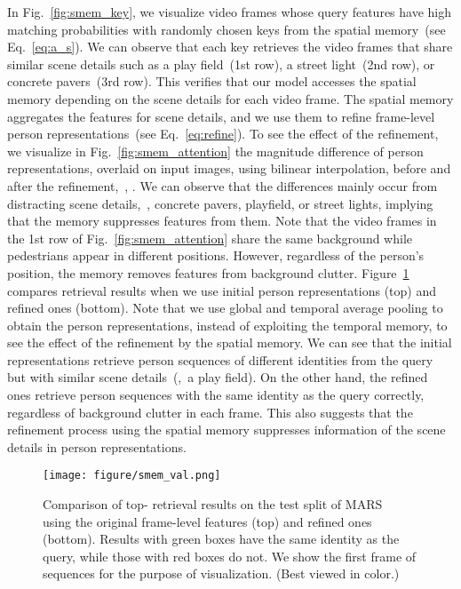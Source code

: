 \documentclass[10pt,twocolumn,letterpaper]{article}
\begin{document}
		
			In Fig.~\ref{fig:smem_key}, we visualize video frames whose query features  have high matching probabilities with randomly chosen keys from the spatial memory~(see Eq.~\eqref{eq:a_s}). We can observe that each key retrieves the video frames that share similar scene details such as a play field~(1st row), a street light~(2nd row), or concrete pavers~(3rd row). This verifies that our model accesses the spatial memory depending on the scene details for each video frame. The spatial memory aggregates the features for scene details, and we use them to refine frame-level person representations~(see Eq.~\eqref{eq:refine}). To see the effect of the refinement, we visualize in Fig.~\ref{fig:smem_attention} the magnitude difference of person representations, overlaid on input images, using bilinear interpolation, before and after the refinement,~\ie, . We can observe that the differences mainly occur from distracting scene details,~\eg, concrete pavers, playfield, or street lights, implying that the memory suppresses features from them. Note that the video frames in the 1st row of Fig.~\ref{fig:smem_attention} share the same background while pedestrians appear in different positions. However, regardless of the person's position, the memory removes features from background clutter. Figure~\ref{fig:smem_val} compares retrieval results when we use initial person representations  (top) and refined ones  (bottom). Note that we use global and temporal average pooling to obtain the person representations, instead of exploiting the temporal memory, to see the effect of the refinement by the spatial memory. We can see that the initial representations retrieve person sequences of different identities from the query but with similar scene details~(\eg,~a play field). On the other hand, the refined ones retrieve person sequences with the same identity as the query correctly, regardless of background clutter in each frame. This also suggests that the refinement process using the spatial memory suppresses information of the scene details in person representations.
			
		
		\begin{figure}[t]
	    	\centering
	    	\texttt{[image: figure/smem\_val.png]}
	    	\caption{Comparison of top- retrieval results on the test split of MARS~\cite{zheng2016mars} using the original frame-level features  (top) and refined ones  (bottom). Results with green boxes have the same identity as the query, while those with red boxes do not. We show the first frame of sequences for the purpose of visualization. (Best viewed in color.)}
	    	\label{fig:smem_val}
	    	\vspace{-0.5cm}
	    \end{figure}
		
\end{document}
